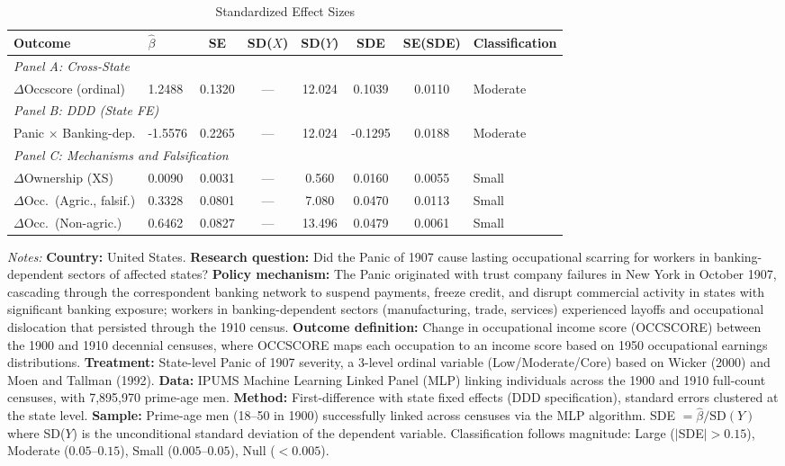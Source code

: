 \begin{table}[H]
\centering
\caption{Standardized Effect Sizes}
\begin{threeparttable}
\small
\begin{tabular}{llcccccl}
\toprule
Outcome & $\hat{\beta}$ & SE & SD($X$) & SD($Y$) & SDE & SE(SDE) & Classification \\
\midrule
\multicolumn{8}{l}{\textit{Panel A: Cross-State}} \\
$\Delta$Occscore (ordinal) & 1.2488 & 0.1320 & --- & 12.024 & 0.1039 & 0.0110 & Moderate \\
\midrule
\multicolumn{8}{l}{\textit{Panel B: DDD (State FE)}} \\
Panic $\times$ Banking-dep. & -1.5576 & 0.2265 & --- & 12.024 & -0.1295 & 0.0188 & Moderate \\
\midrule
\multicolumn{8}{l}{\textit{Panel C: Mechanisms and Falsification}} \\
$\Delta$Ownership (XS) & 0.0090 & 0.0031 & --- & 0.560 & 0.0160 & 0.0055 & Small \\
$\Delta$Occ.\ (Agric., falsif.) & 0.3328 & 0.0801 & --- & 7.080 & 0.0470 & 0.0113 & Small \\
$\Delta$Occ.\ (Non-agric.) & 0.6462 & 0.0827 & --- & 13.496 & 0.0479 & 0.0061 & Small \\
\bottomrule
\end{tabular}
\begin{tablenotes}[flushleft]
\small
\item \textit{Notes:} \textbf{Country:} United States. \textbf{Research question:} Did the Panic of 1907 cause lasting occupational scarring for workers in banking-dependent sectors of affected states? \textbf{Policy mechanism:} The Panic originated with trust company failures in New York in October 1907, cascading through the correspondent banking network to suspend payments, freeze credit, and disrupt commercial activity in states with significant banking exposure; workers in banking-dependent sectors (manufacturing, trade, services) experienced layoffs and occupational dislocation that persisted through the 1910 census. \textbf{Outcome definition:} Change in occupational income score (OCCSCORE) between the 1900 and 1910 decennial censuses, where OCCSCORE maps each occupation to an income score based on 1950 occupational earnings distributions. \textbf{Treatment:} State-level Panic of 1907 severity, a 3-level ordinal variable (Low/Moderate/Core) based on Wicker (2000) and Moen and Tallman (1992). \textbf{Data:} IPUMS Machine Learning Linked Panel (MLP) linking individuals across the 1900 and 1910 full-count censuses, with 7,895,970 prime-age men. \textbf{Method:} First-difference with state fixed effects (DDD specification), standard errors clustered at the state level. \textbf{Sample:} Prime-age men (18--50 in 1900) successfully linked across censuses via the MLP algorithm. SDE $= \hat{\beta} / \text{SD}(Y)$ where SD($Y$) is the unconditional standard deviation of the dependent variable. Classification follows magnitude: Large ($|$SDE$| > 0.15$), Moderate ($0.05$--$0.15$), Small ($0.005$--$0.05$), Null ($< 0.005$).

\end{tablenotes}
\end{threeparttable}
\end{table}
